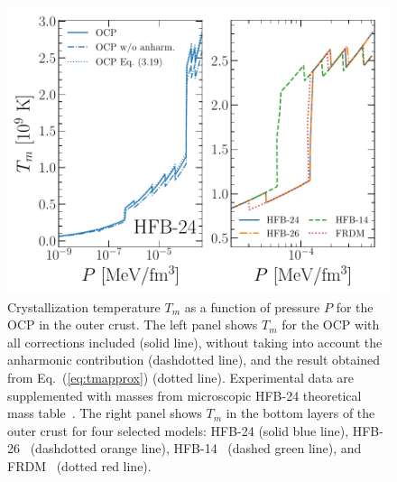 \begin{figure}[!t]
  \begin{center}
    \includegraphics[width=0.9\linewidth]{figures/tm_ocrust.pdf}
  \end{center}
  \caption[Crystallization temperature versus pressure for the one-component 
  plasma in the outer crust]{Crystallization temperature $T_m$ as a function of
    pressure $P$ for the OCP in the outer crust. The left panel shows $T_m$ 
    for the  OCP with all corrections included (solid line), without 
    taking into account the anharmonic contribution (dashdotted line), and 
    the result obtained from Eq.~(\ref{eq:tmapprox}) (dotted line). 
    Experimental data are supplemented with masses from microscopic HFB-24 
    theoretical mass table~\cite{Goriely2013}. 
    The right panel shows $T_m$ in the bottom layers of the outer crust for 
    four selected models: HFB-24 (solid blue line), HFB-26~\cite{Goriely2013}
    (dashdotted orange line), HFB-14~\cite{Goriely2007} (dashed green line), 
  and FRDM~\cite{Moller1995} (dotted red line).}\label{fig:tm_ocrust}
\end{figure}

